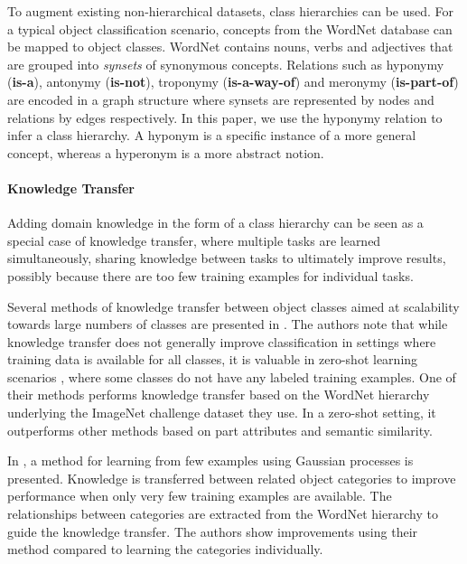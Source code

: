 \documentclass[10pt,twocolumn,letterpaper]{article}
\begin{document}
To augment existing non-hierarchical datasets, class hierarchies can be used.
For a typical object classification scenario, concepts from the WordNet database
\cite{Fellbaum1998WordNet} can be mapped to object classes. WordNet contains
nouns, verbs and adjectives that are grouped into \emph{synsets} of synonymous concepts.
Relations such as hyponymy (\textbf{is-a}), antonymy (\textbf{is-not}), troponymy (\textbf{is-a-way-of}) and meronymy (\textbf{is-part-of}) are encoded in a graph structure
where synsets are represented by nodes and relations by edges respectively. In this paper,
we use the hyponymy relation to infer a class hierarchy. A hyponym is a specific instance
of a more general concept, whereas a hyperonym is a more abstract notion.

\paragraph{Knowledge Transfer}
Adding domain knowledge in the form of a class hierarchy
can be seen as a special case of knowledge transfer, where multiple tasks are learned
simultaneously, sharing knowledge between tasks to ultimately improve
results, possibly because there are too few training examples for individual tasks.

Several methods of knowledge transfer between object classes
aimed at scalability towards large numbers of classes are presented in \cite{Rohrbach2011Zero}.
The authors note that while knowledge transfer does not generally improve classification
in settings where training data is available for all classes, it is valuable
in zero-shot learning scenarios \cite{Palatucci2009Zero}, where some classes do not have any labeled training examples.
One of their methods performs knowledge transfer based on the WordNet hierarchy underlying
the ImageNet challenge dataset they use. In a zero-shot setting, it outperforms other
methods based on part attributes and semantic similarity.

In \cite{Rodner2010OSL}, a method for learning from few examples using Gaussian processes
is presented. Knowledge is transferred between related object categories to improve performance
when only very few training examples are available. The relationships between categories
are extracted from the WordNet hierarchy \cite{Fellbaum1998WordNet} to guide the knowledge
transfer. The authors show improvements using their method compared to learning the categories
individually.

\end{document}
